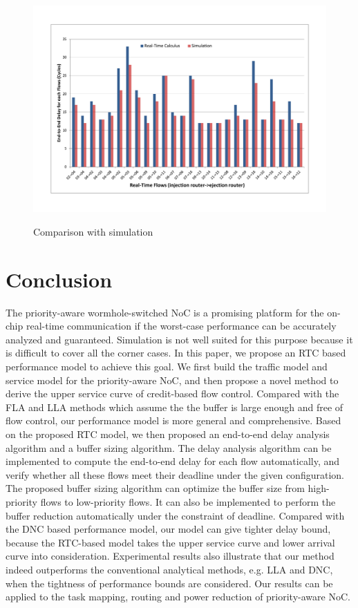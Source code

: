 \documentclass[preprint]{elsarticle}
\begin{document}
\begin{figure}
  \centering
  \includegraphics[scale=0.45]{figures/ericsson.pdf}\\
  \caption{Comparison with simulation}\label{ericsson}
\end{figure}

\section{Conclusion}\label{conclusion}
The priority-aware wormhole-switched NoC is a promising platform for the on-chip real-time communication if the worst-case performance can be accurately analyzed and guaranteed. Simulation is not well suited for this purpose because it is difficult to cover all the corner cases. In this paper, we propose an RTC based performance model to achieve this goal. We first build the traffic model and service model for the priority-aware NoC, and then propose a novel method to derive the upper service curve of credit-based flow control. Compared with the FLA and LLA methods which assume the the buffer is large enough and free of flow control, our performance model is more general and comprehensive. Based on the proposed RTC model, we then proposed an end-to-end delay analysis algorithm and a buffer sizing algorithm. The delay analysis algorithm can be implemented to compute the end-to-end delay for each flow automatically, and verify whether all these flows meet their deadline under the given configuration. The proposed buffer sizing algorithm can optimize the buffer size from high-priority flows to low-priority flows. It can also be implemented to perform the buffer reduction automatically under the constraint of deadline. Compared with the DNC based performance model, our model can give tighter delay bound, because the RTC-based model takes the upper service curve and lower arrival curve into consideration. Experimental results also illustrate that our method indeed outperforms the conventional analytical methods, e.g. LLA and DNC, when the tightness of performance bounds are considered. Our results can be applied to the task mapping, routing and power reduction of priority-aware NoC.
\end{document}
